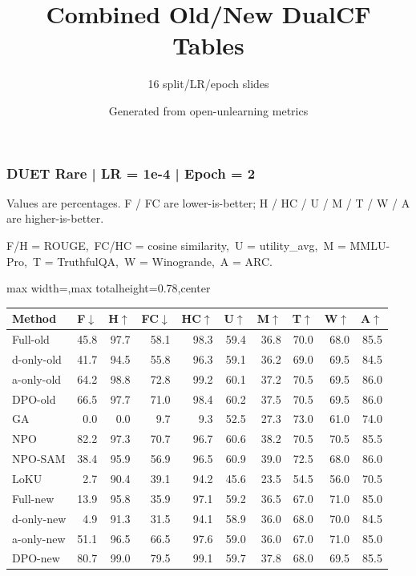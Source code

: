 \documentclass[aspectratio=169,11pt]{beamer}
\title{Combined Old/New DualCF Tables}
\subtitle{16 split/LR/epoch slides}
\author{Generated from open-unlearning metrics}
\date{}
\begin{document}
\begin{frame}[t]
\frametitle{DUET Rare | LR = 1e-4 | Epoch = 2}
{\tiny Values are percentages. F / FC are lower-is-better; H / HC / U / M / T / W / A are higher-is-better.}

{\tiny F/H = ROUGE,\ FC/HC = cosine similarity,\ U = utility\_avg,\ M = MMLU-Pro,\ T = TruthfulQA,\ W = Winogrande,\ A = ARC.}

\vspace{0.35em}
\centering
\scriptsize
\setlength{\tabcolsep}{3.6pt}
\renewcommand{\arraystretch}{1.05}
\begin{adjustbox}{max width=\textwidth,max totalheight=0.78\textheight,center}
\begin{tabular}{l*{9}{r}}
\toprule
Method & F$\downarrow$ & H$\uparrow$ & FC$\downarrow$ & HC$\uparrow$ & U$\uparrow$ & M$\uparrow$ & T$\uparrow$ & W$\uparrow$ & A$\uparrow$ \\
\midrule
\rowcolor{blue!10}
Full-old & 45.8 & 97.7 & 58.1 & 98.3 & 59.4 & 36.8 & 70.0 & 68.0 & 85.5 \\
\rowcolor{orange!10}
d-only-old & 41.7 & 94.5 & 55.8 & 96.3 & 59.1 & 36.2 & 69.0 & 69.5 & 84.5 \\
\rowcolor{green!10}
a-only-old & 64.2 & 98.8 & 72.8 & 99.2 & 60.1 & 37.2 & 70.5 & 69.5 & 86.0 \\
\rowcolor{gray!8}
DPO-old & 66.5 & 97.7 & 71.0 & 98.4 & 60.2 & 37.5 & 70.5 & 69.5 & 86.0 \\
\rowcolor{gray!8}
GA & 0.0 & 0.0 & 9.7 & 9.3 & 52.5 & 27.3 & 73.0 & 61.0 & 74.0 \\
\rowcolor{gray!8}
NPO & 82.2 & 97.3 & 70.7 & 96.7 & 60.6 & 38.2 & 70.5 & 70.5 & 85.5 \\
\rowcolor{gray!8}
NPO-SAM & 38.4 & 95.9 & 56.9 & 96.5 & 60.9 & 39.0 & 72.5 & 68.0 & 86.0 \\
\rowcolor{gray!8}
LoKU & 2.7 & 90.4 & 39.1 & 94.2 & 45.6 & 23.5 & 54.5 & 56.0 & 70.5 \\
\rowcolor{blue!20}
Full-new & 13.9 & 95.8 & 35.9 & 97.1 & 59.2 & 36.5 & 67.0 & 71.0 & 85.0 \\
\rowcolor{orange!20}
d-only-new & 4.9 & 91.3 & 31.5 & 94.1 & 58.9 & 36.0 & 68.0 & 70.0 & 84.5 \\
\rowcolor{green!20}
a-only-new & 51.1 & 96.5 & 66.5 & 97.6 & 59.0 & 36.0 & 67.0 & 71.0 & 85.0 \\
\rowcolor{gray!15}
DPO-new & 80.7 & 99.0 & 79.5 & 99.1 & 59.7 & 37.8 & 68.0 & 69.5 & 85.5 \\
\bottomrule
\end{tabular}
\end{adjustbox}
\end{frame}
\end{document}
